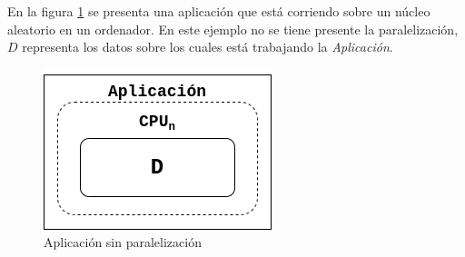 En la figura \ref{fig:sin_paralelizacion_datos} se presenta una aplicación que
está corriendo sobre un núcleo aleatorio en un ordenador. En este ejemplo no se tiene
presente la paralelización, $D$ representa los datos sobre los cuales está
trabajando la \textit{Aplicación}.

\begin{figure}[h]
  \centering
  \includegraphics[width=0.3\linewidth]{figuras/procesamiento_paralelo_sin_paralelizacion_datos.png}
  \caption{Aplicación sin paralelización}
  \label{fig:sin_paralelizacion_datos}
\end{figure}
